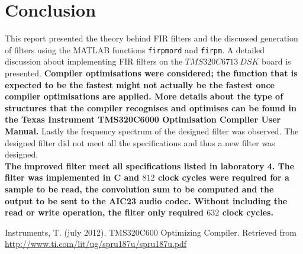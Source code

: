 \documentclass{article}
\begin{document}
\section{Conclusion}
This report presented the theory behind FIR filters and the discussed generation of filters using the MATLAB functions {\tt firpmord} and {\tt firpm}. A detailed discussion about implementing FIR filters on the $TMS320C6713 \ DSK$ board is presented. \textbf{Compiler optimisations were considered; the function that is expected to be the fastest might not actually be the fastest once compiler optimisations are applied. More details about the type of structures that the compiler recognises and optimises can be found in the Texas Instrument TMS320C6000 Optimisation Compiler User Manual.} Lastly the frequency spectrum of the designed filter was observed. The designed filter did not meet all the specifications and thus a new filter was designed.\\ 

\textbf{The improved filter meet all specifications listed in laboratory 4. The filter was implemented in C and $812$ clock cycles were required for a sample to be read, the convolution sum to be computed and the output to be sent to the AIC23 audio codec. Without including the read or write operation, the filter only required $632$ clock cycles.} 

\newpage
\begin{thebibliography}{99}
Instruments, T. (july 2012). TMS320C600 Optimizing Compiler. Retrieved from \url{http://www.ti.com/lit/ug/spru187u/spru187u.pdf}
\end{thebibliography}
\end{document}
